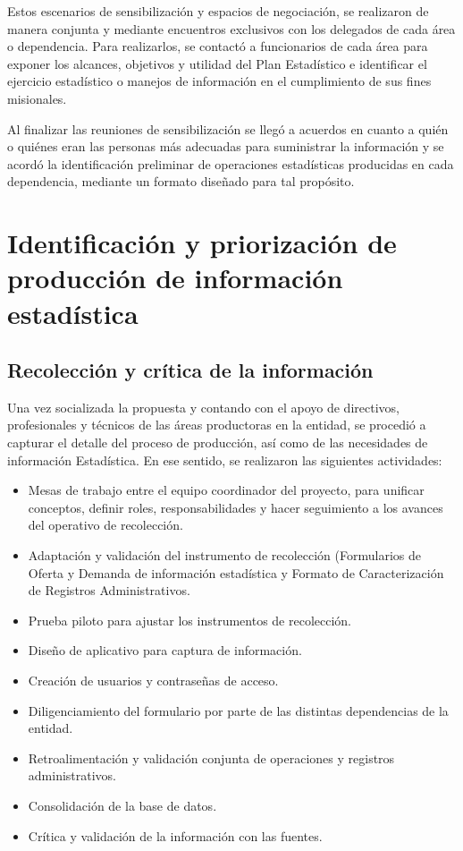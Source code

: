 \documentclass[
]{book}
\begin{document}
Estos escenarios de sensibilización y espacios de negociación, se realizaron de manera conjunta y
mediante encuentros exclusivos con los delegados de cada área o dependencia. Para realizarlos,
se contactó a funcionarios de cada área para exponer los alcances, objetivos y utilidad del Plan
Estadístico e identificar el ejercicio estadístico o manejos de información en el cumplimiento de
sus fines misionales.

Al finalizar las reuniones de sensibilización se llegó a acuerdos en cuanto a quién o quiénes eran
las personas más adecuadas para suministrar la información y se acordó la identificación
preliminar de operaciones estadísticas producidas en cada dependencia, mediante un formato
diseñado para tal propósito.

\hypertarget{identificaciuxf3n-y-priorizaciuxf3n-de-producciuxf3n-de-informaciuxf3n-estaduxedstica}{%
\section{Identificación y priorización de producción de información estadística}\label{identificaciuxf3n-y-priorizaciuxf3n-de-producciuxf3n-de-informaciuxf3n-estaduxedstica}}

\hypertarget{recolecciuxf3n-y-cruxedtica-de-la-informaciuxf3n}{%
\subsection{Recolección y crítica de la información}\label{recolecciuxf3n-y-cruxedtica-de-la-informaciuxf3n}}

Una vez socializada la propuesta y contando con el apoyo de directivos, profesionales y técnicos
de las áreas productoras en la entidad, se procedió a capturar el detalle del proceso de
producción, así como de las necesidades de información Estadística. En ese sentido, se realizaron
las siguientes actividades:

\begin{itemize}
\item
  Mesas de trabajo entre el equipo coordinador del
  proyecto, para unificar conceptos, definir
  roles, responsabilidades y hacer seguimiento a
  los avances del operativo de recolección.
\item
  Adaptación y validación del instrumento
  de recolección (Formularios de Oferta y Demanda de
  información estadística y Formato de Caracterización
  de Registros Administrativos.
\item
  Prueba piloto para ajustar los instrumentos de
  recolección.
\item
  Diseño de aplicativo para captura de información.
\item
  Creación de usuarios y contraseñas de acceso.
\item
  Diligenciamiento del formulario por parte de las
  distintas dependencias de la entidad.
\item
  Retroalimentación y validación conjunta de
  operaciones y registros administrativos.
\item
  Consolidación de la base de datos.
\item
  Crítica y validación de la información con las
  fuentes.
\end{itemize}
\end{document}

